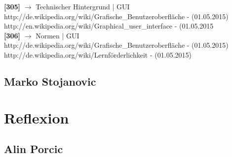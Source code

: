 \documentclass[12pt,a4paper]{report}
\begin{document}
\begin{onehalfspace}
\noindent
\textbf{[305]} $\rightarrow$ Technischer Hintergrund | GUI \\
http://de.wikipedia.org/wiki/Grafische\_Benutzeroberfläche - (01.05.2015)\\
http://en.wikipedia.org/wiki/Graphical\_user\_interface - (01.05.2015\\

\noindent
\textbf{[306]} $\rightarrow$ Normen | GUI \\
http://de.wikipedia.org/wiki/Grafische\_Benutzeroberfläche - (01.05.2015)\\
http://de.wikipedia.org/wiki/Lernförderlichkeit - (01.05.2015)

\chapter{Marko Stojanovic}

\end{onehalfspace}

\part{Reflexion}
\chapter{Alin Porcic}
\end{document}
